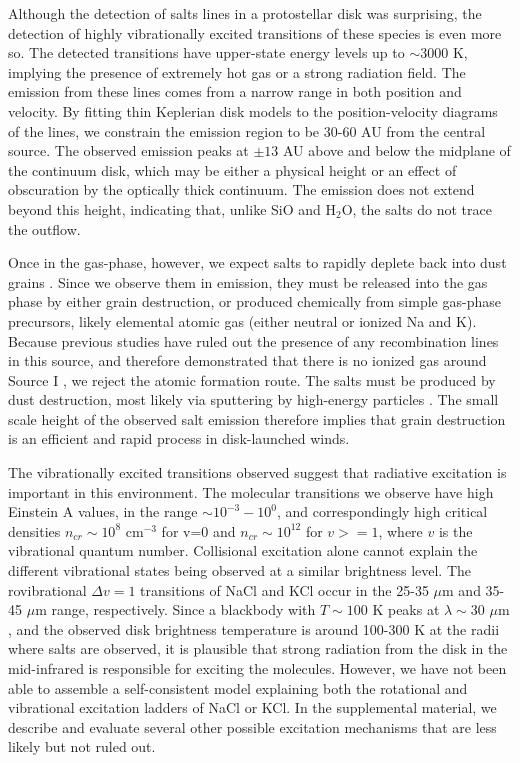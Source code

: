 \documentclass[12pt]{article}
\newcommand{\water}{H$_{2}$O\xspace}		%
\newcommand{\percc}{\ensuremath{\textrm{cm}^{-3}}\xspace}
\newcommand{\um}{\ensuremath{\mu \textrm{m}}\xspace}    %
\begin{document}
Although the detection of salts lines in a protostellar disk was surprising,
the detection of highly vibrationally excited transitions of these species is
even more so.  The detected transitions have upper-state energy levels up to
$\sim3000$ K, implying the presence of extremely hot gas or a strong radiation
field. The emission from these lines comes from a narrow range in both position
and velocity.  By fitting thin Keplerian disk models to the position-velocity
diagrams of the lines, we constrain the emission region to be 30-60 AU from
the central source.  The observed emission peaks at $\pm13$ AU above and below
the midplane of the continuum disk, which may be either a physical height or an
effect of obscuration by the optically thick continuum.  The emission does not
extend beyond this height, indicating that, unlike SiO and \water, the salts do
not trace the outflow.

Once in the gas-phase, however, we expect salts to rapidly deplete back into
dust grains \cite{Cherncheff2012a}.  Since we observe them in emission, they
must be released into the gas phase by either grain destruction, or produced
chemically from simple gas-phase precursors, likely elemental atomic gas
(either neutral or ionized Na and K).  Because previous studies have ruled out
the presence of any recombination lines in this source, and therefore
demonstrated that there is no ionized gas around Source I
\cite{Plambeck2016a,Baez-Rubio2018a}, we reject the atomic formation route.
The salts must be produced by dust destruction, most likely via sputtering by
high-energy particles \cite{Schilke1997a}.  The small scale height of the
observed salt emission therefore implies that grain destruction is an efficient
and rapid process in disk-launched winds.

The vibrationally excited transitions observed suggest that radiative
excitation is important in this environment.  The molecular transitions we
observe have high Einstein A values, in the range $\sim10^{-3}-10^0$, and
correspondingly high critical densities $n_{cr} \sim10^{8}$ \percc for v=0
and $n_{cr} \sim 10^{12}$ for $v>=1$, where $v$
is the vibrational quantum number.  Collisional excitation alone cannot explain
the different vibrational states being observed at a similar brightness level.
The rovibrational $\Delta v=1$ transitions of NaCl and KCl occur in the 25-35
\um and 35-45 \um range, respectively.  Since a blackbody with $T\sim100$ K
peaks at $\lambda\sim30$ \um, and the observed disk brightness temperature is
around 100-300 K at the radii where salts are observed, it is plausible that
strong radiation from the disk in the mid-infrared is responsible for exciting
the molecules.  However, we have not been able to assemble a self-consistent
model explaining both the rotational and vibrational excitation ladders of NaCl
or KCl.  In the supplemental material, we describe  and evaluate several other
possible excitation mechanisms that are less likely but not ruled out.
\end{document}
